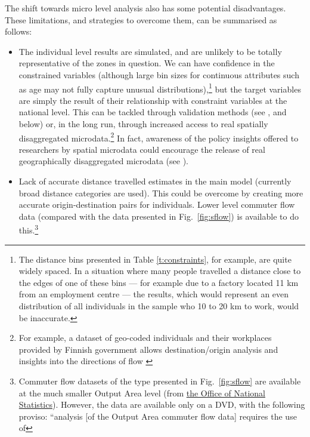 The shift towards micro level analysis also has some potential
disadvantages. These limitations,
and strategies to overcome them, can be summarised as follows:
\begin{itemize}
 \item The individual level results are simulated, and are unlikely to be
 totally representative of the zones in question. We can have confidence
 in the constrained variables (although large bin sizes for continuous
 attributes such as age may not fully capture unusual
 distributions),\footnote{The
 distance bins presented in Table \ref{t:constraints}, for example,
 are quite widely spaced. In a situation where many people
 travelled a distance close to the edges of one of these bins --- for example
 due to a factory located 11 km from an employment centre --- the results,
 which would represent an even distribution of
 all individuals in the sample who 10 to 20 km to work, would
 be inaccurate.}
 but the target variables are simply the result of their relationship with
 constraint variables at the national level. This can be tackled through
 validation methods (see \citealp{Edwards2009}, and
 below) or, in the long run, through increased access to real spatially
 disaggregated
 microdata.\footnote{For example, a dataset of geo-coded
individuals and their workplaces provided by Finnish government allows
destination/origin analysis and insights into the directions of flow
\citep{Helminen2007}
}
In fact, awareness of the policy insights offered to researchers
by spatial microdata could encourage the release of real
geographically disaggregated microdata (see \citep{Lee2009}).
\item Lack of accurate distance travelled estimates in the main model
(currently broad distance categories are used). This could be overcome by creating
more accurate origin-destination pairs for individuals. Lower level commuter
flow data (compared with the data presented in Fig.~\ref{fig:sflow}) is
available to do this.\footnote{Commuter flow
datasets of the type presented in Fig.~\ref{fig:sflow} are available at the much
smaller Output Area level
(from
\href{http://www.ons.gov.uk/ons/guide-method/census/census-2001/data-and-products/data-and-product-catalogue/origin---destination-statistics/output-areas/index.html}
{the Office of National Statistics}). However, the data are available only on a DVD, with the following proviso:
``analysis [of the Output Area commuter flow data] requires the use of
}
\end{itemize}

